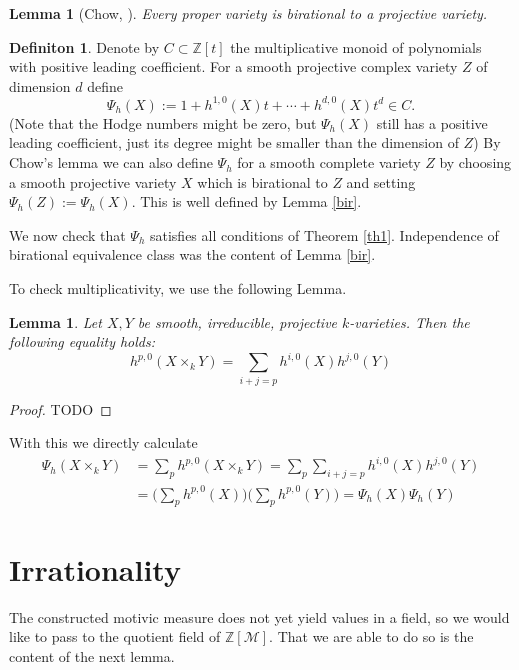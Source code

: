 \documentclass[11pt, a4paper, german]{article}
\theoremstyle{plain}
\newtheorem{lemma}[theorem]{Lemma}
\theoremstyle{definition}
\newtheorem{definition}[theorem]{Definiton}
\begin{document}
\begin{lemma}[Chow, {\cite[II Ex. 4.10]{Ha}}]
    Every proper variety is birational to a projective variety.
\end{lemma}

\begin{definition}
    Denote by $C \subset \mathbb{Z}[t]$ the multiplicative monoid of polynomials with positive leading coefficient.
    For a smooth projective complex variety $Z$ of dimension $d$ define
    \[
        \Psi_h(X) := 1 + h^{1,0}(X)t + \cdots + h^{d,0}(X)t^d \in C.
    \]
    (Note that the Hodge numbers might be zero, but $\Psi_h(X)$ still has a positive leading coefficient, 
    just its degree might be smaller than the dimension of $Z$)
    By Chow's lemma we can also define $\Psi_h$ for a smooth complete variety $Z$ by choosing a smooth projective variety $X$ which is birational
    to $Z$ and setting $\Psi_h(Z) := \Psi_h(X)$. This is well defined by Lemma \ref{bir}.
\end{definition}

We now check that $\Psi_h$ satisfies all conditions of Theorem \ref{th1}. Independence of birational equivalence class was the content of Lemma
\ref{bir}. 

To check multiplicativity, we use the following Lemma.

\begin{lemma}
    Let $X,Y$ be smooth, irreducible, projective $k$-varieties. Then the following equality holds:
    \[
        h^{p,0}(X \times_k Y) = \sum_{i+j=p} h^{i,0}(X)h^{j,0}(Y)
    \]
\end{lemma}
\begin{proof} TODO \end{proof}

With this we directly calculate
\begin{align*}
    \Psi_h(X \times_k Y) & = \sum_p h^{p,0}(X \times_k Y) = \sum_p \sum_{i+j=p} h^{i,0}(X)h^{j,0}(Y) \\
    & = \Big (\sum_p h^{p,0}(X) \Big) \Big(\sum_p h^{p,0}(Y)\Big) = \Psi_h(X) \Psi_h(Y)
\end{align*}


\section{Irrationality}

The constructed motivic measure does not yet yield values in a field, so we would like to pass to the quotient field of $\mathbb{Z}[\mathcal{M}]$.
That we are able to do so is the content of the next lemma.
\end{document}
